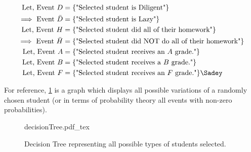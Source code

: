 \begin{align}
	\text{Let, Event } D &= \set{\text{"Selected student is Diligent"}} \nonumber\\
	\text{$\implies$ Event } \bar{D} &= \set{\text{"Selected student is Lazy"}} \nonumber\\
	\text{Let, Event } H &= \set{\text{"Selected student did all of their homework"}} \nonumber\\
	\text{$\implies$ Event } \bar{H} &= \set{\text{"Selected student did NOT do all of their homework"}} \nonumber\\
	\text{Let, Event } A &= \set{\text{"Selected student receives an $A$ grade."}} \nonumber\\
	\text{Let, Event } B &= \set{\text{"Selected student receives a $B$ grade."}} \nonumber\\
		\text{Let, Event } F &= \set{\text{"Selected student receives an $F$ grade."}} \nonumber \Sadey
\end{align}

For reference, \cref{fig:decisionTree} is a graph which displays all possible variations of a randomly chosen student (or in terms of probability theory all events with non-zero probabilities).

\begin{figure}[H]
	\centering
	\begin{adjustbox}{max width=\textwidth}
		{decisionTree.pdf_tex}
	\end{adjustbox}
	\caption{Decision Tree representing all possible types of students selected.}
	\label{fig:decisionTree}
\end{figure}

